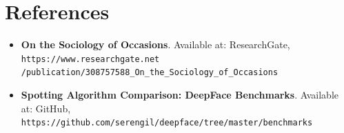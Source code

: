 \documentclass[12pt,a4paper]{report}
\begin{document}
\section*{References}

\begin{itemize}
    \item \textbf{On the Sociology of Occasions}. Available at: ResearchGate, \texttt{https://www.researchgate.net\\/publication/308757588\_On\_the\_Sociology\_of\_Occasions}
    
    \item \textbf{Spotting Algorithm Comparison: DeepFace Benchmarks}. Available at: GitHub, \texttt{https://github.com/serengil/deepface/tree/master/benchmarks}
\end{itemize}
\end{document}
